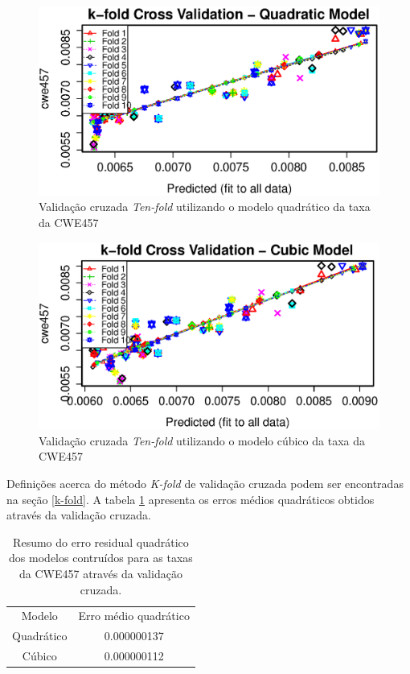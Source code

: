 \begin{figure}[h]
  \centering
  \includegraphics[width=1.0\textwidth]
      {figuras/cwe457-k-fold-quadratic.eps}
      \caption{Validação cruzada \textit{Ten-fold} utilizando o modelo
      quadrático da taxa da CWE457}
  \label{fig:cwe457-k-fold-quadratic}
\end{figure}

\begin{figure}[h]
  \centering
  \includegraphics[width=1.0\textwidth]
      {figuras/cwe457-k-fold-cubic.eps}
      \caption{Validação cruzada \textit{Ten-fold} utilizando o modelo
      cúbico da taxa da CWE457}
  \label{fig:cwe457-k-fold-cubic}
\end{figure}

Definições acerca do método \textit{K-fold} de validação cruzada podem ser
encontradas na seção \ref{k-fold}. A tabela \ref{tab:cwe457-emq} apresenta os
erros médios quadráticos obtidos através da validação cruzada.

\begin{table}[h]
 \centering
 \begin{tabular}{cc}
  \rowcolor[HTML]{EFEFEF} 
  {Modelo} & {Erro médio quadrático} \\
  Quadrático   & 0.000000137 \\
  Cúbico       & 0.000000112
 \end{tabular}
 \caption{Resumo do erro residual quadrático dos modelos contruídos para as taxas da
 CWE457 através da validação cruzada.}
 \label{tab:cwe457-emq}
\end{table}

